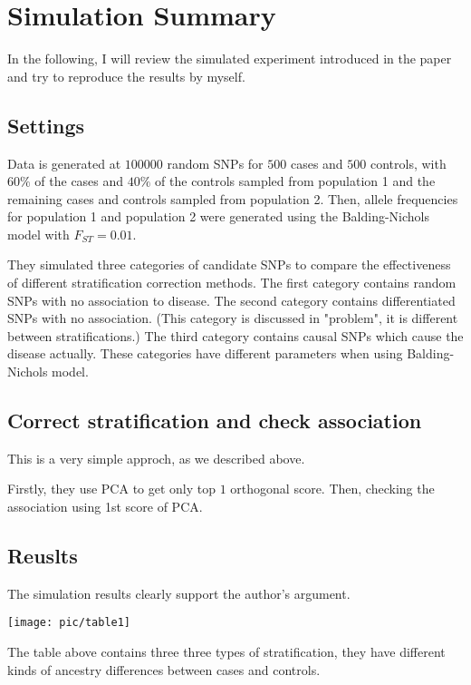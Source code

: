 \section{Simulation Summary}

In the following, I will review the simulated experiment introduced in the paper and try to reproduce the results by myself.

\subsection{Settings}

Data is generated at $100000$ random SNPs for $500$ cases and $500$ controls, with $60\%$ of the cases and $40\%$ of the controls sampled from population 1 and the remaining  cases and controls sampled from population 2. 
Then, allele frequencies for population 1 and population 2 were generated using the Balding-Nichols model with $F_{ST}= 0.01$.

They simulated three categories of candidate SNPs to compare the effectiveness of different stratification correction methods. 
The first category contains random SNPs with no association to disease. 
The second category contains differentiated SNPs with no association. (This category is discussed in "problem", it is different between stratifications.)
The third category contains causal SNPs which cause the disease actually.
These categories have different parameters when using Balding-Nichols model.

\subsection{Correct stratification and check association}
This is a very simple approch, as we described above. 

Firstly, they use PCA to get only top $1$ orthogonal score. 
Then, checking the association using 1st score of PCA. 

\subsection{Reuslts}

The simulation results clearly support the author's argument.

{\noindent\texttt{[image: pic/table1]}}

The table above contains three three types of stratification, they have different kinds of ancestry differences between cases and controls. 


